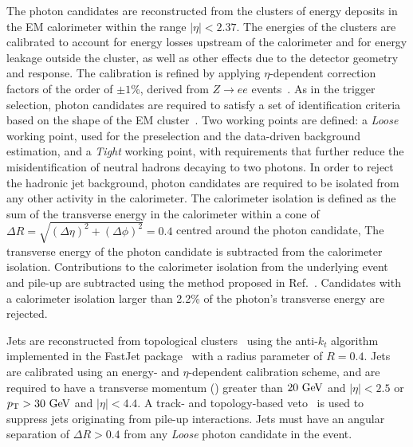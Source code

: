 The photon candidates are reconstructed from the clusters of energy deposits in the EM calorimeter within the range $|\eta|<2.37$.
The energies of the clusters are calibrated to account for energy losses upstream of the calorimeter 
and for energy leakage outside the cluster, as well as other effects due to the detector geometry and response.
The calibration is refined by applying $\eta$-dependent correction factors of the order of $\pm1$\%, derived from $Z\to ee$ events~\cite{PERF-2013-05}.
As in the trigger selection, photon candidates are required to satisfy a set of identification criteria based on the shape of the EM cluster~\cite{PERF-2013-04}.
Two working points are defined: a \textit{Loose} working point, used for the preselection and the data-driven background estimation, and a 
\textit{Tight} working point, with requirements that further reduce the misidentification of neutral hadrons decaying to two photons.
In order to reject the hadronic jet background, photon candidates are required to be isolated from any other activity in the calorimeter.
The calorimeter isolation is defined as the sum of the transverse energy in the
calorimeter within a cone of \mbox{$\Delta R = \sqrt{(\Delta\eta)^2+(\Delta\phi)^2}=0.4$} centred around the photon candidate,
The transverse energy of the photon candidate is subtracted from the calorimeter isolation.
Contributions to the calorimeter isolation from the underlying event and pile-up are subtracted using the method proposed in Ref.~\cite{jetareas}.
Candidates with a calorimeter isolation larger than 2.2\% of the photon's transverse energy are rejected.

Jets are reconstructed from topological clusters~\cite{PERF-2014-07} using the anti-$k_t$
algorithm~\cite{Cacciari:2008gp} implemented in the FastJet package~\cite{Cacciari:2011ma} with a radius parameter of $R=0.4$. 
Jets are calibrated using an energy- and $\eta$-dependent
calibration scheme, and are required to have a transverse momentum (\pt{}) greater than $20~\mathrm{GeV}{}$ and $|\eta|<2.5$ or $p_{\text{T}}>30~\mathrm{GeV}{}$ and $|\eta|<4.4$.
A track- and topology-based veto~\cite{PERF-2014-03,PERF-2016-06} is used to suppress jets originating from pile-up interactions.
Jets must have an angular separation of $\Delta R>0.4$ from any \textit{Loose} photon candidate in the event.

